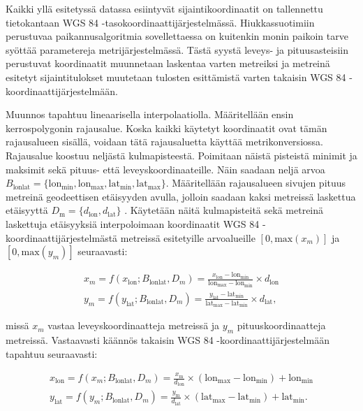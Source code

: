 \documentclass[
  12pt,
  a4paper, twoside]{book}
\begin{document}
Kaikki yllä esitetyssä datassa esiintyvät sijaintikoordinaatit on tallennettu tietokantaan WGS 84 -tasokoordinaattijärjestelmässä. Hiukkassuotimiin perustuvaa paikannusalgoritmia sovellettaessa on kuitenkin monin paikoin tarve syöttää parametereja metrijärjestelmässä. Tästä syystä leveys- ja pituusasteisiin perustuvat koordinaatit muunnetaan laskentaa varten metreiksi ja metreinä esitetyt sijaintitulokset muutetaan tulosten esittämistä varten takaisin WGS 84 -koordinaattijärjestelmään.

Muunnos tapahtuu lineaarisella interpolaatiolla. Määritellään ensin kerrospolygonin rajausalue. Koska kaikki käytetyt koordinaatit ovat tämän rajausalueen sisällä, voidaan tätä rajausaluetta käyttää metrikonversiossa. Rajausalue koostuu neljästä kulmapisteestä. Poimitaan näistä pisteistä minimit ja maksimit sekä pituus- että leveyskoordinaateille. Näin saadaan neljä arvoa \(B_{\text{lonlat}}=\{\text{lon}_{\text{min}}, \text{lon}_{\text{max}}, \text{lat}_{\text{min}}, \text{lat}_{\text{max}}\}\). Määritellään rajausalueen sivujen pituus metreinä geodeettisen etäisyyden avulla, jolloin saadaan kaksi metreissä laskettua etäisyyttä \(D_{\text{m}}=\{d_{\text{lon}}, d_{\text{lat}}\}\) . Käytetään näitä kulmapisteitä sekä metreinä laskettuja etäisyyksiä interpoloimaan koordinaatit WGS 84 -koordinaattijärjestelmästä metreissä esitetyille arvoalueille \([0, \text{max}(x_m)]\) ja \([0, \text{max}(y_m)]\) seuraavasti:

\begin{align}\label{wgs84-m}
x_m = f(x_{\text{lon}}; B_{\text{lonlat}}, D_m) = \frac{x_{\text{lon}} -\text{lon}_{\text{min}}}{\text{lon}_{\text{max}}-\text{lon}_{\text{min}}} \times d_{\text{lon}}   \\
y_m = f(y_{\text{lat}}; B_{\text{lonlat}}, D_m) = \frac{y_{\text{lat}} -\text{lat}_{\text{min}}}{\text{lat}_{\text{max}}-\text{lat}_{\text{min}}} \times d_{\text{lat}}
,\end{align}

missä \(x_m\) vastaa leveyskoordinaatteja metreissä ja \(y_m\) pituuskoordinaatteja metreissä. Vastaavasti käännös takaisin WGS 84 -koordinaattijärjestelmään tapahtuu seuraavasti:

\begin{align}\label{m-wgs84}
x_{\text{lon}} = f(x_m; B_{\text{lonlat}}, D_m) = \frac{x_{\text{m}}}{d_{\text{lon}}} \times (\text{lon}_{\text{max}}-\text{lon}_{\text{min}}) + \text{lon}_{\text{min}} \\
y_{\text{lat}} = f(y_m; B_{\text{lonlat}}, D_m) = \frac{y_{\text{m}}}{d_{\text{lat}}} \times (\text{lat}_{\text{max}}-\text{lat}_{\text{min}}) + \text{lat}_{\text{min}}
.\end{align}
\end{document}
